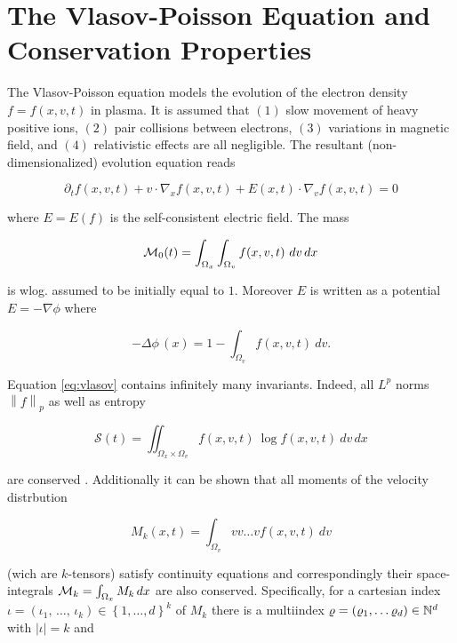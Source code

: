 
\section{The Vlasov-Poisson Equation and Conservation Properties}\label{sec:vlasov}

The Vlasov-Poisson equation models the evolution of the electron density $f = f(x, v, t)$ 
in plasma. It is assumed that $(1)$ slow movement of heavy positive ions, $(2)$ pair 
collisions between electrons, $(3)$ variations in magnetic field, and $(4)$ relativistic 
effects are all negligible. The resultant (non-dimensionalized) evolution equation reads

\begin{equation}\label{eq:vlasov}
    \partial_t f (x, v, t) 
    + v \cdot \nabla_x f (x, v, t) 
    + E (x, t) \cdot \nabla_v f (x, v, t) = 0
\end{equation}

where $E = E(f)$ is the self-consistent electric field. The mass 

\begin{equation}
    \mathcal{M}_0 (t) = \int_{\Omega_x} \int_{\Omega_v} f(x, v, t)\ dv\, dx
\end{equation}

is wlog. assumed to be initially equal to $1$. Moreover $E$ is written as a potential 
$E = - \nabla \phi$ where 

\begin{equation}
    - \Delta \phi\,(x) = 1 - \int_{\Omega_v} f(x, v, t)\ dv . 
\end{equation}

Equation \ref{eq:vlasov} contains infinitely many invariants. Indeed, all $L^p$ norms 
$\left\| f \right\|_p$ as well as entropy 

\begin{equation}
    \mathcal{S} (t) = \iint_{\Omega_x \times \Omega_v} f(x, v, t)\ \log f(x, v, t)\ dv\,dx
\end{equation}

are conserved \cite{}. Additionally it can be shown 
that all moments of the velocity distrbution

\begin{equation}
    M_k (x, t) = \int_{\Omega_v} v v \ldots v f(x, v, t)\ dv 
\end{equation}

(wich are $k$-tensors) satisfy continuity equations and correspondingly their 
space-integrals $\mathcal{M}_k = \int_{\Omega_x} M_k\, dx$ are also conserved. Specifically, 
for a cartesian index 
$\iota = (\iota_1,\, \ldots,\, \iota_k) \in \left\{ 1, \ldots, d \right\}^k$ of $M_k$ 
there is a multiindex $\varrho = \left( \varrho_1, \ldots \varrho_d \right) \in \mathbb{N}^d$ with 
$| \iota | = k$ and 

